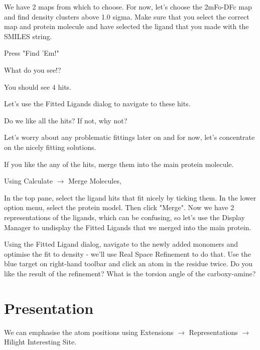 \documentclass{article}
\begin{document}
 We have 2 maps from which to choose.  For now, let's choose the
 2mFo-DFc map and find density clusters above 1.0 sigma.  Make sure
 that you select the correct map and protein molecule and have
 selected the ligand that you made with the SMILES string.

 Press \textsf{"Find 'Em!"}

 \begin{trivlist}
 \item What do you see!? 

\textsf{You should see 4 hits.  }
 \end{trivlist}




Let's use the Fitted Ligands dialog to navigate to these hits.

\begin{trivlist}
\item Do we like all the hits?  If not, why not?  

\textsf{Let's worry about any problematic fittings later on and for
 now, let's concentrate on the nicely fitting solutions.}
\end{trivlist}


\begin{trivlist}
\item If you like the any of the hits, merge them into the main
  protein molecule.

Using \textsf{Calculate $\rightarrow$ Merge Molecules}, 

\end{trivlist}

 In the top pane, select the ligand hits that fit nicely by ticking
 them.  In the lower option menu, select the protein model.  Then
 click "Merge".  Now we have 2 representations of the ligands, which
 can be confusing, so let's use the Display Manager to undisplay the
 Fitted Ligands that we merged into the main protein.

 Using the Fitted Ligand dialog, navigate to the newly added monomers
 and optimise the fit to density - we'll use Real Space Refinement to
 do that.  Use the blue target on right-hand toolbar and click an atom
 in the residue twice.  Do you like the result of the refinement?
 What is the torsion angle of the carboxy-amine?

\section{Presentation}

 We can emphasise the atom positions using 
 \textsf{Extensions $\rightarrow$ Representations $\rightarrow$ Hilight Interesting Site}.
\end{document}
